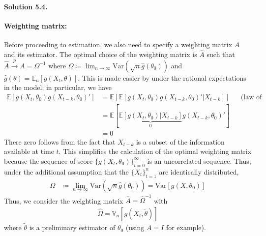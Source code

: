 \documentclass[11pt]{article}
\newenvironment{solution}[1]
    {\bigskip\noindent\textbf{Solution #1.} \par}
    {\medskip}
\newcommand{\ev}{\mathbb{E}}
\begin{document}
\begin{solution}{5.4}
\paragraph{Weighting matrix:} Before proceeding to estimation, we also need to specify a weighting matrix $A$ and its estimator. The optimal choice of the weighting matrix is $\hat{A}$ such that $\hat{A} \xrightarrow{p} A = \Omega^{-1}$ where $\Omega \coloneq \lim_{n\to\infty} \text{Var}(\sqrt{n}\hat{g}(\theta_0))$ and $\hat{g}(\theta) = \ev_n[g(X_t,\theta)].$ This is made easier by under the rational expectations in the model; in particular, we have 
\begin{align*}
    \ev[g(X_{t},\theta_0)g(X_{t-k},\theta_0)']
    &= \ev[  \ev[g(X_{t},\theta_0)g(X_{t-k},\theta_0)'|X_{t-k}]   ] &&\text{(law of iterated expectations)} \\
    &= \ev[  \underbrace{\ev[g(X_{t},\theta_0)|X_{t-k}]}_{0}g(X_{t-k},\theta_0)'  ] \\
    &= 0
\end{align*}
There zero follows from the fact that $X_{t-k}$ is a subset of the information available at time $t.$ This simplifies the calculation of the optimal weighting matrix because the sequence of score $\{g(X_t,\theta_0) \}_{t=0}^\infty$ is an uncorrelated sequence. Thus, under the additional assumption that the $\{X_{t}\}_{t=1}^n$ are identically distributed, 
\begin{align*}
    \Omega 
    &\coloneq \lim_{n\to\infty} \text{Var}(\sqrt{n}\hat{g}(\theta_0)) = \text{Var}[g(X,\theta_0)]
\end{align*}
Thus, we consider the weighting matrix $\hat{A} = \hat{\Omega}^{-1}$ with 
\begin{align*}
    \hat{\Omega}  = \mathbb{V}_n[g(X_t,\tilde{\theta})]
\end{align*}
where $\tilde\theta$ is a preliminary estimator of $\theta_0$ (using $A = I$ for example).


\end{solution}
\end{document}
